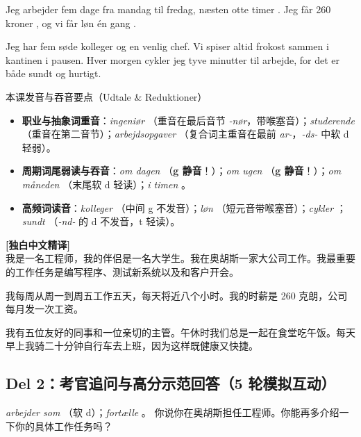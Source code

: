 Jeg arbejder fem dage  fra mandag til fredag, næsten otte timer . Jeg får 260 kroner , og vi får løn én gang .

Jeg har fem søde kolleger og en venlig chef. Vi spiser altid frokost sammen i kantinen i pausen. Hver morgen cykler jeg tyve minutter til arbejde, for det er både sundt og hurtigt.

\begin{tipbox}{本课发音与吞音要点（Udtale \& Reduktioner）}
\begin{itemize}
  \item \textbf{职业与抽象词重音}：\textit{ingeniør} （重音在最后音节 \textit{-nør}，带喉塞音）；\textit{studerende} （重音在第二音节）；\textit{arbejdsopgaver} （复合词主重音在最前 \textit{ar-}，\textit{-ds-} 中软 d 轻弱）。
  \item \textbf{周期词尾弱读与吞音}：\textit{om dagen} （\textbf{g 静音}！）；\textit{om ugen} （\textbf{g 静音}！）；\textit{om måneden} （末尾软 d 轻读）；\textit{i timen} 。
  \item \textbf{高频词读音}：\textit{kolleger} （中间 g 不发音）；\textit{løn} （短元音带喉塞音）；\textit{cykler} ；\textit{sundt} （\textit{-nd-} 的 d 不发音，t 轻读）。
\end{itemize}
\end{tipbox}

\begin{transbox}
\small
\textbf{\color{NCDTeal}[独白中文精译]}\\
我是一名工程师，我的伴侣是一名大学生。我在奥胡斯一家大公司工作。我最重要的工作任务是编写程序、测试新系统以及和客户开会。

我每周从周一到周五工作五天，每天将近八个小时。我的时薪是 260 克朗，公司每月发一次工资。

我有五位友好的同事和一位亲切的主管。午休时我们总是一起在食堂吃午饭。每天早上我骑二十分钟自行车去上班，因为这样既健康又快捷。
\end{transbox}

\subsection*{Del 2：考官追问与高分示范回答（5 轮模拟互动）}

{\textit{arbejder som} （软 d）；\textit{fortælle} 。}
{你说你在奥胡斯担任工程师。你能再多介绍一下你的具体工作任务吗？}

